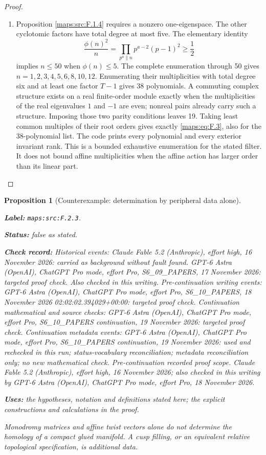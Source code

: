 \documentclass[11pt,a4paper]{article}
\newtheorem{proposition}[proposition]{Proposition}
\theoremstyle{definition}
\newcommand{\StatementRecord}[4]{\par\smallskip\begingroup\upshape\raggedright\noindent\textbf{Label:} \nolinkurl{#1}.\par\noindent\textbf{Status:} #2.\par\noindent\textbf{Check record:} #3.\par\noindent\textbf{Uses:} #4.\par\endgroup\smallskip}
\begin{document}
\begin{proof}
\begin{enumerate}[label=\arabic*.]
\item Proposition \ref{maps:src:F.1.4} requires a nonzero one-eigenspace.  The other
cyclotomic factors have total degree at most five.  The elementary
identity
\[
 \frac{\phi(n)^2}{n}=
 \prod_{p^a\parallel n}p^{a-2}(p-1)^2\geq\frac12
\]
implies $n\leq50$ when $\phi(n)\leq5$.
The complete enumeration through 50 gives
$n=1,2,3,4,5,6,8,10,12$.  Enumerating their multiplicities
with total degree six and at least one factor $T-1$ gives 38
polynomials.  A commuting complex structure exists on a real
finite-order module exactly when the multiplicities of the
real eigenvalues $1$ and $-1$ are even; nonreal pairs already
carry such a structure.  Imposing those two parity conditions
leaves 19.  Taking least common multiples of their root orders
gives exactly \eqref{maps:eq:F.3}, also for the 38-polynomial list.
The code prints every polynomial and every exterior invariant
rank.  This is a bounded exhaustive enumeration for the
stated filter.  It does not bound affine multiplicities when
the affine action has larger order than its linear part.

\end{enumerate}
\end{proof}




\begin{proposition}[Counterexample: determination by peripheral data alone]\label{maps:src:F.2.3}
\StatementRecord{maps:src:F.2.3}{false as stated}{Historical events: Claude Fable 5.2 (Anthropic), effort high, 16 November 2026: carried as background without fault found. GPT-6 Astra (OpenAI), ChatGPT Pro mode, effort Pro, S6\_09\_PAPERS, 17 November 2026: targeted proof check. Also checked in this writing. Pre-continuation writing events: GPT-6 Astra (OpenAI), ChatGPT Pro mode, effort Pro, S6\_10\_PAPERS, 18 November 2026 02:02:02.394029+00:00: targeted proof check. Continuation mathematical and source checks: GPT-6 Astra (OpenAI), ChatGPT Pro mode, effort Pro, S6\_10\_PAPERS continuation, 19 November 2026: targeted proof check. Continuation metadata events: GPT-6 Astra (OpenAI), ChatGPT Pro mode, effort Pro, S6\_10\_PAPERS continuation, 19 November 2026: used and rechecked in this run; status-vocabulary reconciliation; metadata reconciliation only; no new mathematical check. \emph{Pre-continuation recorded proof scope.} Claude Fable 5.2 (Anthropic), effort high, 16 November 2026; also checked in this writing by GPT-6 Astra (OpenAI), ChatGPT Pro mode, effort Pro, 18 November 2026}{the hypotheses, notation and definitions stated here; the explicit constructions and calculations in the proof}


Monodromy matrices and affine twist vectors alone do not
determine the homology of a compact glued manifold.  A cusp
filling, or an equivalent relative topological specification,
is additional data.

\end{proposition}
\end{document}
